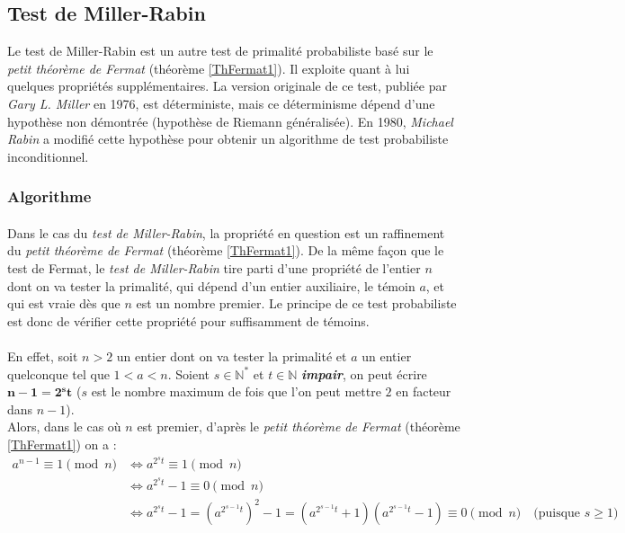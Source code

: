 \subsection{Test de Miller-Rabin}
	Le test de Miller-Rabin est un autre test de primalité probabiliste basé sur le \textit{petit théorème de Fermat} (théorème \ref{ThFermat1}). Il exploite quant à lui quelques propriétés supplémentaires. La version originale de ce test, publiée par \textit{Gary L. Miller} en 1976, est déterministe, mais ce déterminisme dépend d'une hypothèse non démontrée (hypothèse de Riemann généralisée). En 1980, \textit{Michael Rabin} a modifié cette hypothèse pour obtenir un algorithme de test probabiliste inconditionnel.
	
	\subsubsection{Algorithme}
		
		\paragraph{} Dans le cas du \textit{test de Miller-Rabin}, la propriété en question est un raffinement du \textit{petit théorème de Fermat} (théorème \ref{ThFermat1}). De la même façon que le test de Fermat, le \textit{test de Miller-Rabin} tire parti d'une propriété de l'entier $n$ dont on va tester la primalité, qui dépend d'un entier auxiliaire, le témoin $a$, et qui est vraie dès que $n$ est un nombre premier. Le principe de ce test probabiliste est donc de vérifier cette propriété pour suffisamment de témoins.
		
		\paragraph{}En effet, soit $n > 2$ un entier dont on va tester la primalité et $a$ un entier quelconque tel que $1 < a < n$. Soient $s \in \mathbb{N}^{*}$ et $t \in \mathbb{N}$ \textbf{\textit{impair}}, on peut écrire $\mathbf{n - 1 = 2^{s}t}$ ($s$ est le nombre maximum de fois que l'on peut mettre $2$ en facteur dans $n - 1$).\\
		\indent Alors, dans le cas où $n$ est premier, d'après le \textit{petit théorème de Fermat} (théorème \ref{ThFermat1}) on a :
		\begin{align*}
			a^{n-1}\equiv 1 \pmod n &\Leftrightarrow a^{2^{s}t}\equiv 1 \pmod n\\
									&\Leftrightarrow a^{2^{s}t} - 1 \equiv 0 \pmod n\\
									&\Leftrightarrow a^{2^{s}t} - 1 = (a^{2^{s-1}t})^{2} - 1 = (a^{2^{s-1}t} + 1)(a^{2^{s-1}t} - 1) \equiv 0 \pmod n	\quad	\text{(puisque } s \geqslant 1 \text{)}
		\end{align*}
		
